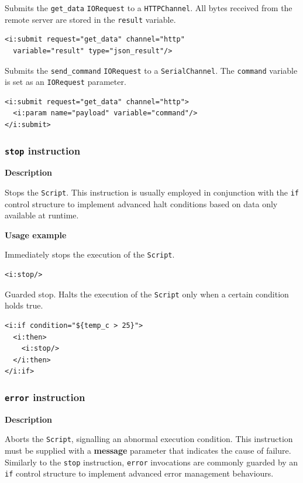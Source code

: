 Submits the \texttt{get\_data} \texttt{IORequest} to a \texttt{HTTPChannel}.
All bytes received from the remote server are stored in the \texttt{result}
variable.

\lstset{language=XML}
\begin{lstlisting}
<i:submit request="get_data" channel="http"
  variable="result" type="json_result"/>
\end{lstlisting}

Submits the \texttt{send\_command} \texttt{IORequest} to a
\texttt{SerialChannel}.  The \texttt{command} variable is set as an
\texttt{IORequest} parameter.

\lstset{language=XML}
\begin{lstlisting}
<i:submit request="get_data" channel="http">
  <i:param name="payload" variable="command"/>
</i:submit>
\end{lstlisting}


\subsubsection{\texttt{stop} instruction}

\textbf{Description}

Stops the \texttt{Script}. This instruction is usually employed in conjunction
with the \texttt{if} control structure to implement advanced halt conditions
based on data only available at runtime.

\textbf{Usage example}

Immediately stops the execution of the \texttt{Script}.

\lstset{language=XML}
\begin{lstlisting}
<i:stop/>
\end{lstlisting}

Guarded stop. Halts the execution of the \texttt{Script} only when a certain
condition holds true.

\lstset{language=XML}
\begin{lstlisting}
<i:if condition="${temp_c > 25}"> 
  <i:then>
    <i:stop/>
  </i:then>
</i:if>
\end{lstlisting}


\subsubsection{\texttt{error} instruction}

\textbf{Description}

Aborts the \texttt{Script}, signalling an abnormal execution condition. This
instruction must be supplied with a \textbf{message} parameter that indicates
the cause of failure. Similarly to the \texttt{stop} instruction,
\texttt{error} invocations are commonly guarded by an \texttt{if} control
structure to implement advanced error management behaviours.

